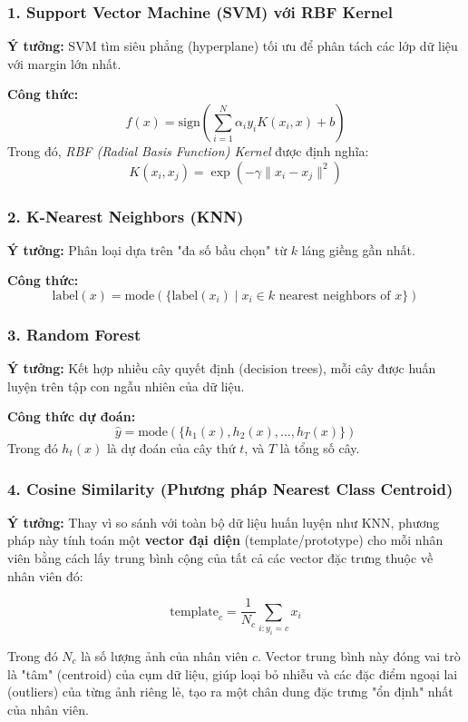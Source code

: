 \documentclass[a4paper]{book}
\begin{document}
\subsubsection{1. Support Vector Machine (SVM) với RBF Kernel}
\textbf{Ý tưởng:} SVM tìm siêu phẳng (hyperplane) tối ưu để phân tách các lớp dữ liệu với margin lớn nhất.

\textbf{Công thức:}
\[
f(x) = \text{sign}\left(\sum_{i=1}^{N} \alpha_i y_i K(x_i, x) + b\right)
\]
Trong đó, \textit{RBF (Radial Basis Function) Kernel} được định nghĩa:
\[
K(x_i, x_j) = \exp\left(-\gamma \|x_i - x_j\|^2\right)
\]

\subsubsection{2. K-Nearest Neighbors (KNN)}
\textbf{Ý tưởng:} Phân loại dựa trên "đa số bầu chọn" từ $k$ láng giềng gần nhất.

\textbf{Công thức:}
\[
\text{label}(x) = \text{mode}\left(\{ \text{label}(x_i) \mid x_i \in k \text{ nearest neighbors of } x \}\right)
\]

\subsubsection{3. Random Forest}
\textbf{Ý tưởng:} Kết hợp nhiều cây quyết định (decision trees), mỗi cây được huấn luyện trên tập con ngẫu nhiên của dữ liệu.

\textbf{Công thức dự đoán:}
\[
\hat{y} = \text{mode}\left(\{ h_1(x), h_2(x), \ldots, h_T(x) \}\right)
\]
Trong đó $h_t(x)$ là dự đoán của cây thứ $t$, và $T$ là tổng số cây.

\subsubsection{4. Cosine Similarity (Phương pháp Nearest Class Centroid)}

\textbf{Ý tưởng:} Thay vì so sánh với toàn bộ dữ liệu huấn luyện như KNN, phương pháp này tính toán một \textbf{vector đại diện} (template/prototype) cho mỗi nhân viên bằng cách lấy trung bình cộng của tất cả các vector đặc trưng thuộc về nhân viên đó:

\[
\text{template}_c = \frac{1}{N_c} \sum_{i: y_i = c} x_i
\]

Trong đó $N_c$ là số lượng ảnh của nhân viên $c$. Vector trung bình này đóng vai trò là "tâm" (centroid) của cụm dữ liệu, giúp loại bỏ nhiễu và các đặc điểm ngoại lai (outliers) của từng ảnh riêng lẻ, tạo ra một chân dung đặc trưng "ổn định" nhất của nhân viên.
\end{document}
